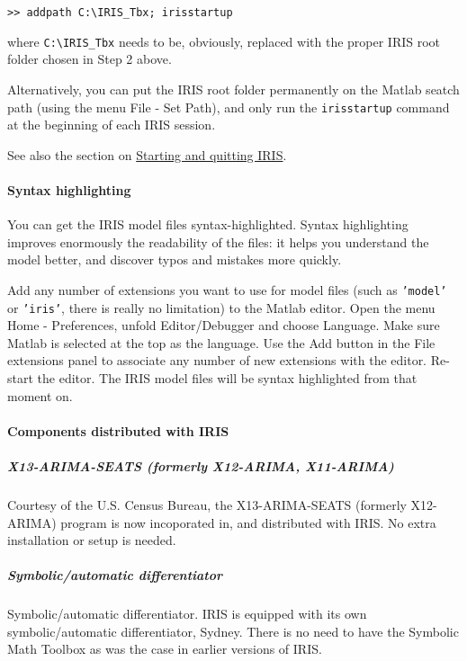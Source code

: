 \begin{verbatim}
>> addpath C:\IRIS_Tbx; irisstartup
\end{verbatim}

where \texttt{C:\textbackslash{}IRIS\_Tbx} needs to be, obviously,
replaced with the proper IRIS root folder chosen in Step 2 above.

Alternatively, you can put the IRIS root folder permanently on the
Matlab seatch path (using the menu File - Set Path), and only run the
\texttt{irisstartup} command at the beginning of each IRIS session.

See also the section on \href{config/Contents}{Starting and quitting
IRIS}.

\paragraph{Syntax highlighting}

You can get the IRIS model files syntax-highlighted. Syntax highlighting
improves enormously the readability of the files: it helps you
understand the model better, and discover typos and mistakes more
quickly.

Add any number of extensions you want to use for model files (such as
\texttt{'model'} or \texttt{'iris'}, there is really no limitation) to
the Matlab editor. Open the menu Home - Preferences, unfold
Editor/Debugger and choose Language. Make sure Matlab is selected at the
top as the language. Use the Add button in the File extensions panel to
associate any number of new extensions with the editor. Re-start the
editor. The IRIS model files will be syntax highlighted from that moment
on.

\paragraph{Components distributed with
IRIS}

\subparagraph{X13-ARIMA-SEATS (formerly X12-ARIMA,
X11-ARIMA)}

Courtesy of the U.S. Census Bureau, the X13-ARIMA-SEATS (formerly
X12-ARIMA) program is now incoporated in, and distributed with IRIS. No
extra installation or setup is needed.

\subparagraph{Symbolic/automatic
differentiator}

Symbolic/automatic differentiator. IRIS is equipped with its own
symbolic/automatic differentiator, Sydney. There is no need to have the
Symbolic Math Toolbox as was the case in earlier versions of IRIS.



